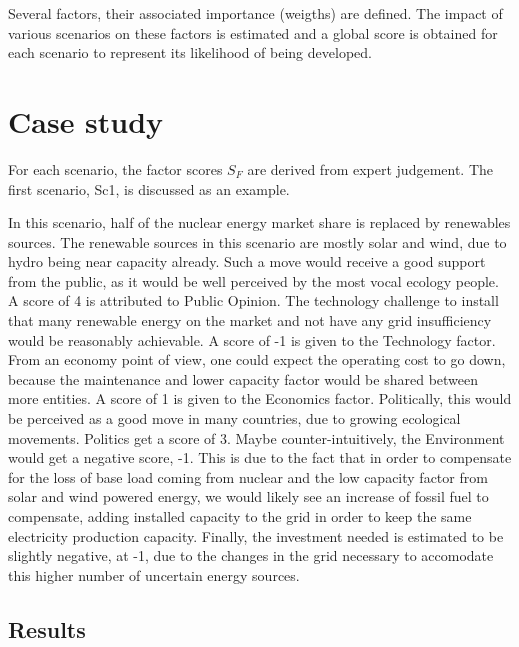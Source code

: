 \documentclass[IJPHM, 2017, 29]{PHMSociety}
\begin{document}
Several factors, their associated importance (weigths) are defined. The impact of various scenarios on these factors is estimated and a global score is obtained for each scenario to represent its likelihood of being developed.

\section{Case study}
\label{sec:study}

For each scenario, the factor scores $S_F$ are derived from expert judgement. The first scenario, Sc1, is discussed as an example.

In this scenario, half of the nuclear energy market share is replaced by renewables sources. The renewable sources in this scenario are mostly solar and wind, due to hydro being near capacity already. Such a move would receive a good support from the public, as it would be well perceived by the most vocal ecology people. A score of 4 is attributed to Public Opinion. The technology challenge to install that many renewable energy on the market and not have any grid insufficiency would be reasonably achievable. A score of -1 is given to the Technology factor. From an economy point of view, one could expect the operating cost to go down, because the maintenance and lower capacity factor would be shared between more entities. A score of 1 is given to the Economics factor. Politically, this would be perceived as a good move in many countries, due to growing ecological movements. Politics get a score of 3. Maybe counter-intuitively, the Environment would get a negative score, -1. This is due to the fact that in order to compensate for the loss of base load coming from nuclear and the low capacity factor from solar and wind powered energy, we would likely see an increase of fossil fuel to compensate, adding installed capacity to the grid in order to keep the same electricity production capacity. Finally, the investment needed is estimated to be slightly negative, at -1, due to the changes in the grid necessary to accomodate this higher number of uncertain energy sources.


\subsection{Results}
\end{document}
